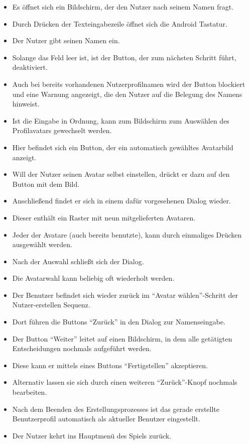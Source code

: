 \begin{itemize}
\item Es öffnet sich ein Bildschirm, der den Nutzer nach seinem Namen fragt.
\item Durch Drücken der Texteingabezeile öffnet sich die Android Tastatur.
\item Der Nutzer gibt seinen Namen ein. 
\item Solange das Feld leer ist, ist der Button, der zum nächsten Schritt führt, deaktiviert.
\item  Auch bei bereits vorhandenen Nutzerprofilnamen wird der Button blockiert und eine Warnung angezeigt,
die den Nutzer auf die Belegung des Namens hinweist. 
\item Ist die Eingabe in Ordnung, kann zum Bildschirm zum Auswählen des Profilavatars gewechselt werden.
\item Hier befindet sich ein Button, der ein automatisch gewähltes Avatarbild anzeigt.
\item Will der Nutzer seinen Avatar selbst einstellen, drückt er dazu auf den Button mit dem Bild.
\item Anschließend findet er sich in einem dafür vorgesehenen Dialog wieder.
\item Dieser enthält ein Raster mit neun mitgelieferten Avataren.
\item Jeder der Avatare (auch bereits benutzte), kann durch einmaliges Drücken ausgewählt werden.
\item Nach der Auswahl schließt sich der Dialog.
\item Die Avatarwahl kann beliebig oft wiederholt werden.
\item Der Benutzer befindet sich wieder zurück im "`Avatar wählen"'-Schritt der Nutzer-erstellen Sequenz.
\item Dort führen die Buttons "`Zurück"' in den Dialog zur Namenseingabe.
\item Der Button "`Weiter"' leitet auf einen Bildschirm, in dem alle getätigten Entscheidungen
nochmals aufgeführt werden. 
\item Diese kann er mittels eines Buttons "`Fertigstellen"' akzeptieren.
\item Alternativ lassen sie sich durch einen weiteren "`Zurück"'-Knopf 
nochmals bearbeiten.
\item Nach dem Beenden des Erstellungsprozesses ist das gerade erstellte 
Benutzerprofil automatisch als aktueller Benutzer eingestellt.
\item Der Nutzer kehrt ins Hauptmenü des Spiels zurück.
\end{itemize}
